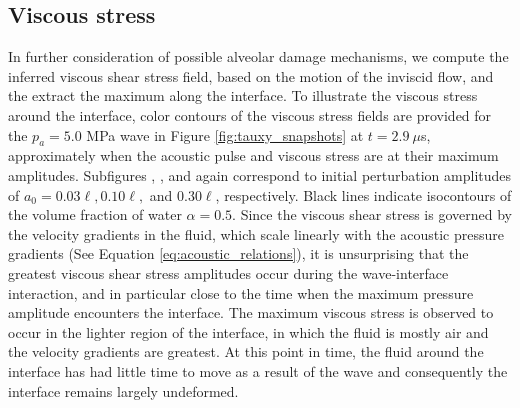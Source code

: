 \subsection{Viscous stress}
In further consideration of possible alveolar damage mechanisms, we
compute the inferred viscous shear stress field, based on the motion
of the inviscid flow, and the extract the maximum along the
interface. To illustrate the viscous stress around the interface,
color contours of the viscous stress fields are provided for the
$p_a = 5.0$ MPa wave in Figure \ref{fig:tauxy_snapshots} at
$t=2.9~\mu$s, approximately when the acoustic pulse and viscous stress
are at their maximum amplitudes. Subfigures
,
, and
 again correspond to initial
perturbation amplitudes of $a_0 = 0.03\ell, 0.10\ell,$ and $0.30\ell$,
respectively. Black lines indicate isocontours of the volume fraction
of water $\alpha = 0.5$. Since the viscous shear stress is governed by
the velocity gradients in the fluid, which scale linearly with the
acoustic pressure gradients (See Equation
\ref{eq:acoustic_relations}), it is unsurprising that the greatest
viscous shear stress amplitudes occur during the wave-interface
interaction, and in particular close to the time when the maximum
pressure amplitude encounters the interface. The maximum viscous
stress is observed to occur in the lighter region of the interface, in
which the fluid is mostly air and the velocity gradients are
greatest. At this point in time, the fluid around the interface has
had little time to move as a result of the wave and consequently the
interface remains largely undeformed.

